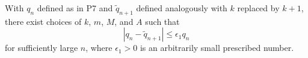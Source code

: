 With $q_n$ defined as in P7 and $\tilde{q}_{n+1}$ defined analogously with $k$ replaced by $k+1$, there exist choices of $k$, $m$, $M$, and $A$ such that
$$|q_n - \tilde{q}_{n+1}| \leq \epsilon_1 q_n$$
for sufficiently large $n$, where $\epsilon_1 > 0$ is an arbitrarily small prescribed number.

